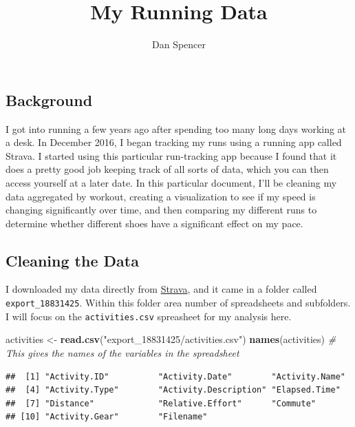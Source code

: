 \documentclass[]{article}
\title{My Running Data}
\author{Dan Spencer}
\date{}
\newenvironment{Shaded}{\begin{snugshade}}{\end{snugshade}}
\newcommand{\CommentTok}[1]{\textcolor[rgb]{0.56,0.35,0.01}{\textit{#1}}}
\newcommand{\KeywordTok}[1]{\textcolor[rgb]{0.13,0.29,0.53}{\textbf{#1}}}
\newcommand{\NormalTok}[1]{#1}
\newcommand{\StringTok}[1]{\textcolor[rgb]{0.31,0.60,0.02}{#1}}
\begin{document}
\maketitle

\hypertarget{background}{%
\subsection{Background}\label{background}}

I got into running a few years ago after spending too many long days
working at a desk. In December 2016, I began tracking my runs using a
running app called Strava. I started using this particular run-tracking
app because I found that it does a pretty good job keeping track of all
sorts of data, which you can then access yourself at a later date. In
this particular document, I'll be cleaning my data aggregated by
workout, creating a visualization to see if my speed is changing
significantly over time, and then comparing my different runs to
determine whether different shoes have a significant effect on my pace.

\hypertarget{cleaning-the-data}{%
\subsection{Cleaning the Data}\label{cleaning-the-data}}

I downloaded my data directly from
\href{https://www.strava.com/}{Strava}, and it came in a folder called
\texttt{export\_18831425}. Within this folder area number of
spreadsheets and subfolders. I will focus on the \texttt{activities.csv}
spreasheet for my analysis here.

\begin{Shaded}
\begin{Highlighting}[]
\NormalTok{activities <-}\StringTok{ }\KeywordTok{read.csv}\NormalTok{(}\StringTok{"export_18831425/activities.csv"}\NormalTok{)}
\KeywordTok{names}\NormalTok{(activities) }\CommentTok{# This gives the names of the variables in the spreadsheet}
\end{Highlighting}
\end{Shaded}

\begin{verbatim}
##  [1] "Activity.ID"          "Activity.Date"        "Activity.Name"       
##  [4] "Activity.Type"        "Activity.Description" "Elapsed.Time"        
##  [7] "Distance"             "Relative.Effort"      "Commute"             
## [10] "Activity.Gear"        "Filename"
\end{verbatim}
\end{document}
